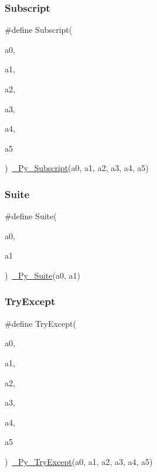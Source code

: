 \mbox{\label{_python-ast_8h_a49a0a37e937fc34b38da7b8eef6c6ea9}} 
\subsubsection{\texorpdfstring{Subscript}{Subscript}}
{\footnotesize\ttfamily \#define Subscript(\begin{DoxyParamCaption}\item[{}]{a0,  }\item[{}]{a1,  }\item[{}]{a2,  }\item[{}]{a3,  }\item[{}]{a4,  }\item[{}]{a5 }\end{DoxyParamCaption})~\mbox{\hyperlink{_python-ast_8h_a4f0bd3273fab37948889711e668fcc5c}{\+\_\+\+Py\+\_\+\+Subscript}}(a0, a1, a2, a3, a4, a5)}

\mbox{\label{_python-ast_8h_a0463d5ea08f733cdcfa44c9dcaa9b3ed}} 
\subsubsection{\texorpdfstring{Suite}{Suite}}
{\footnotesize\ttfamily \#define Suite(\begin{DoxyParamCaption}\item[{}]{a0,  }\item[{}]{a1 }\end{DoxyParamCaption})~\mbox{\hyperlink{_python-ast_8h_a7a0cc82ce7beb48bc2e9811f63ce1d9f}{\+\_\+\+Py\+\_\+\+Suite}}(a0, a1)}

\mbox{\label{_python-ast_8h_a88c347936a7d01ec132bdc2411ad5ba5}} 
\subsubsection{\texorpdfstring{TryExcept}{TryExcept}}
{\footnotesize\ttfamily \#define Try\+Except(\begin{DoxyParamCaption}\item[{}]{a0,  }\item[{}]{a1,  }\item[{}]{a2,  }\item[{}]{a3,  }\item[{}]{a4,  }\item[{}]{a5 }\end{DoxyParamCaption})~\mbox{\hyperlink{_python-ast_8h_ae5f1aab66bb67790df6acd7da5c88846}{\+\_\+\+Py\+\_\+\+Try\+Except}}(a0, a1, a2, a3, a4, a5)}

